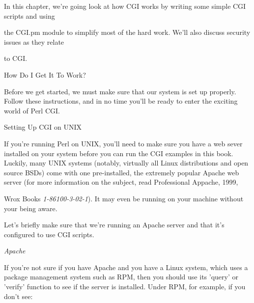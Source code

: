 \documentclass[a4paper,11pt]{book}
\begin{document}
\noindent 

\noindent In  this  chapter,  we're going  look  at  how  CGI  works  by  writing  some  simple  CGI  scripts  and  using

\noindent the CGI.pm module to  simplify  most  of  the  hard  work.  We'll also  discuss  security  issues  as  they relate

\noindent to  CGI.

\noindent 

\noindent 

\noindent How Do I Get It To Work?

\noindent 

\noindent Before we  get started, we must make sure that our system is set up properly. Follow these instructions, and in no time you'll be ready to enter the exciting world of Perl CGI.

\noindent 

\noindent Setting Up CGI on UNIX

\noindent 

\noindent If you're running Perl on UNIX, you'll need to make sure you have a web sever installed on your system before you can run the CGI examples in this book. Luckily, many UNIX systems (notably, virtually all Linux distributions and open source BSDs) come with one pre-installed, the extremely popular Apache web server (for more information on the subject, read Professional Appache, 1999,

\noindent Wrox Books \textit{1-86100-3-02-1}). It may even be running on your machine without your being aware.

\noindent 

\noindent Let's briefly make sure that we're running an Apache server and that it's configured to use CGI scripts.

\noindent  

\noindent  

\noindent  

\noindent  

\noindent 

\noindent 

\noindent \textit{Apache}

\noindent If you're not sure if you have Apache and you have a Linux system, which uses a package management system such as RPM, then you should use its 'query' or 'verify' function to see if the server is installed. Under RPM, for example, if you don't see:

\noindent 
\end{document}
